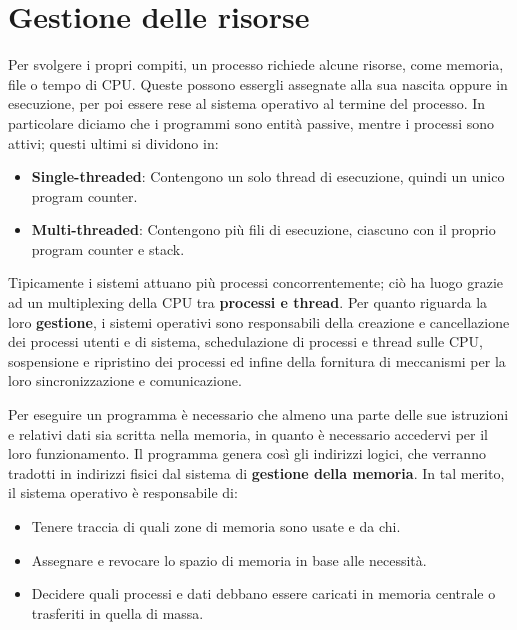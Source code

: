 %

\section{Gestione delle risorse}
Per svolgere i propri compiti, un processo richiede alcune risorse, come memoria, file o tempo di CPU. Queste possono essergli assegnate alla sua nascita oppure in esecuzione, per poi essere rese al sistema operativo al termine del processo. In particolare diciamo che i programmi sono entità passive, mentre i processi sono attivi; questi ultimi si dividono in: \begin{itemize}
	\item \textbf{Single-threaded}: Contengono un solo thread di esecuzione, quindi un unico program counter.
	\item \textbf{Multi-threaded}: Contengono più fili di esecuzione, ciascuno con il proprio program counter e stack.
\end{itemize}
\noindent Tipicamente i sistemi attuano più processi concorrentemente; ciò ha luogo grazie ad un multiplexing della CPU tra \textbf{processi e thread}. Per quanto riguarda la loro \textbf{gestione}, i sistemi operativi sono responsabili della creazione e cancellazione dei processi utenti e di sistema, schedulazione di processi e thread sulle CPU, sospensione e ripristino dei processi ed infine della fornitura di meccanismi per la loro sincronizzazione e comunicazione.\par
Per eseguire un programma è necessario che almeno una parte delle sue istruzioni e relativi dati sia scritta nella memoria, in quanto è necessario accedervi per il loro funzionamento. Il programma genera così gli indirizzi logici, che verranno tradotti in indirizzi fisici dal sistema di \textbf{gestione della memoria}. In tal merito, il sistema operativo è responsabile di: \begin{itemize}
	\item Tenere traccia di quali zone di memoria sono usate e da chi.
	\item Assegnare e revocare lo spazio di memoria in base alle necessità.
	\item Decidere quali processi e dati debbano essere caricati in memoria centrale o trasferiti in quella di massa.
\end{itemize}
